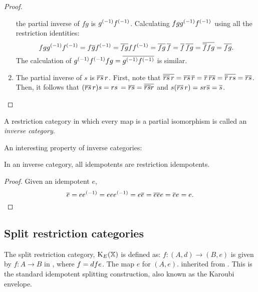 \begin{proof}
\begin{enumerate}[{(}i{)}]
      the partial inverse of $f g$ is ${g}^{(-1)} {f}^{(-1)}$. Calculating $f g {g}^{(-1)} {f}^{(-1)}$
      using all the restriction identities:
      \[
        f g {g}^{(-1)} {f}^{(-1)} = f \overline{g} {f}^{(-1)} = \overline{f g} f {f}^{(-1)} =
        \overline{f g}\, \overline{f} = \overline{f}\, \overline{f g} = \overline{\overline{f} f g} = \overline{f g}.
      \]
      The calculation of ${g}^{(-1)} {f}^{(-1)} f g = \overline{{g}^{(-1)} {f}^{(-1)}}$ is similar.
    \item The partial inverse of $s$ is $\overline{r s}\,r$. First, note
      that $\overline{\overline{r s}\,r}
      = \overline{r s}\,\overline{r}
      = \overline{r}\, \overline{r s}
      = \overline{\overline{r}\,r s}
      = \overline{r s}$.
      Then, it follows that $(\overline{r s}\,r) s
      = r s\,= \overline{r s}
      = \overline{\overline{r s}r} $ and
      $s (\restr{r s}\,r)
      = s r \restr{s} %
      = \restr{s}$.
  \end{enumerate}
\end{proof}


A restriction category in which every map is a partial
isomorphism is called an \emph{inverse category}.

An interesting property of inverse categories:

\begin{lemma}
  \label{lem:inverse_idempotents_are_restriction_idempotents}
  In an inverse category, all idempotents are restriction idempotents.
\end{lemma}
\begin{proof}
  Given an idempotent $e$,
  \[
    \overline{e} = e{e}^{(-1)} = e e {e}^{(-1)} = e \overline{e} = \overline{e e} e = \overline{e} e = e.
  \]
\end{proof}
\subsection{Split restriction categories} %
\label{sub:split_restriction_categories}

The split restriction category, $\text{K}_{E}(\mathbb{X})$  is defined as:
  {$f:(A,d)\to(B,e)$ is given by $f:A\to B$ in \X, where $f = d\hspace{0.1pt} f e$.}
  {The map $e$ for $(A,e)$.}
  {inherited from \X.}
This is the standard idempotent splitting construction, also known as the Karoubi
envelope.

